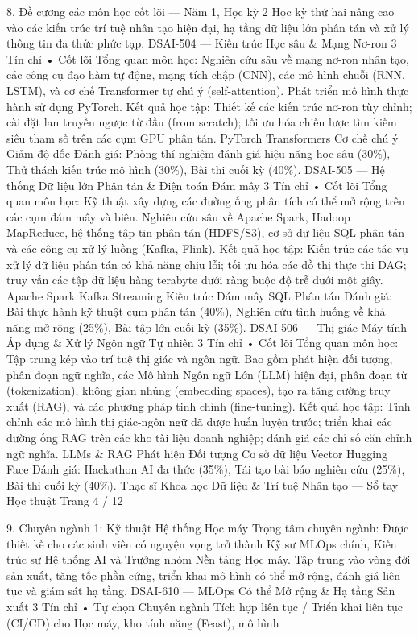 \documentclass[12pt]{article}
\begin{document}
8. Đề cương các môn học cốt lõi — Năm 1, Học kỳ 2
Học kỳ thứ hai nâng cao vào các kiến trúc trí tuệ nhân tạo hiện đại, hạ tầng dữ liệu lớn phân tán và xử lý thông tin đa thức phức tạp.
DSAI-504 — Kiến trúc Học sâu \& Mạng Nơ-ron
3 Tín chỉ • Cốt lõi
Tổng quan môn học: Nghiên cứu sâu về mạng nơ-ron nhân tạo, các công cụ đạo hàm tự động, mạng tích chập (CNN), các mô hình chuỗi (RNN, LSTM), và cơ chế Transformer tự chú ý (self-attention). Phát triển mô hình thực hành sử dụng PyTorch.
Kết quả học tập: Thiết kế các kiến trúc nơ-ron tùy chỉnh; cài đặt lan truyền ngược từ đầu (from scratch); tối ưu hóa chiến lược tìm kiếm siêu tham số trên các cụm GPU phân tán.
PyTorch Transformers Cơ chế chú ý Giảm độ dốc
Đánh giá: Phòng thí nghiệm đánh giá hiệu năng học sâu (30\%), Thử thách kiến trúc mô hình (30\%), Bài thi cuối kỳ (40\%).
DSAI-505 — Hệ thống Dữ liệu lớn Phân tán \& Điện toán Đám mây
3 Tín chỉ • Cốt lõi
Tổng quan môn học: Kỹ thuật xây dựng các đường ống phân tích có thể mở rộng trên các cụm đám mây và biên. Nghiên cứu sâu về Apache Spark, Hadoop MapReduce, hệ thống tập tin phân tán (HDFS/S3), cơ sở dữ liệu SQL phân tán và các công cụ xử lý luồng (Kafka, Flink).
Kết quả học tập: Kiến trúc các tác vụ xử lý dữ liệu phân tán có khả năng chịu lỗi; tối ưu hóa các đồ thị thực thi DAG; truy vấn các tập dữ liệu hàng terabyte dưới ràng buộc độ trễ dưới một giây.
Apache Spark Kafka Streaming Kiến trúc Đám mây SQL Phân tán
Đánh giá: Bài thực hành kỹ thuật cụm phân tán (40\%), Nghiên cứu tình huống về khả năng mở rộng (25\%), Bài tập lớn cuối kỳ (35\%).
DSAI-506 — Thị giác Máy tính Áp dụng \& Xử lý Ngôn ngữ Tự nhiên
3 Tín chỉ • Cốt lõi
Tổng quan môn học: Tập trung kép vào trí tuệ thị giác và ngôn ngữ. Bao gồm phát hiện đối tượng, phân đoạn ngữ nghĩa, các Mô hình Ngôn ngữ Lớn (LLM) hiện đại, phân đoạn từ (tokenization), không gian nhúng (embedding spaces), tạo ra tăng cường truy xuất (RAG), và các phương pháp tinh chỉnh (fine-tuning).
Kết quả học tập: Tinh chỉnh các mô hình thị giác-ngôn ngữ đã được huấn luyện trước; triển khai các đường ống RAG trên các kho tài liệu doanh nghiệp; đánh giá các chỉ số căn chỉnh ngữ nghĩa.
LLMs \& RAG Phát hiện Đối tượng Cơ sở dữ liệu Vector Hugging Face
Đánh giá: Hackathon AI đa thức (35\%), Tái tạo bài báo nghiên cứu (25\%), Bài thi cuối kỳ (40\%).
Thạc sĩ Khoa học Dữ liệu \& Trí tuệ Nhân tạo — Sổ tay Học thuật
Trang 4 / 12

9. Chuyên ngành 1: Kỹ thuật Hệ thống Học máy
Trọng tâm chuyên ngành: Được thiết kế cho các sinh viên có nguyện vọng trở thành Kỹ sư MLOps chính, Kiến trúc sư Hệ thống AI và Trưởng nhóm Nền tảng Học máy. Tập trung vào vòng đời sản xuất, tăng tốc phần cứng, triển khai mô hình có thể mở rộng, đánh giá liên tục và giám sát hạ tầng.
DSAI-610 — MLOps Có thể Mở rộng \& Hạ tầng Sản xuất
3 Tín chỉ • Tự chọn Chuyên ngành
Tích hợp liên tục / Triển khai liên tục (CI/CD) cho Học máy, kho tính năng (Feast), mô hình
\end{document}
